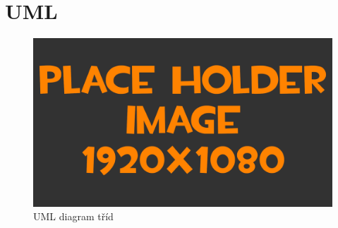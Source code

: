 
\section{UML}
\begin{figure}[h!]
	\centering
	\includegraphics[width=\textwidth]{pictures/placeHolderFHD.png}
    	\caption{UML diagram tříd}
   	\label{fig:uml}
\end{figure}
